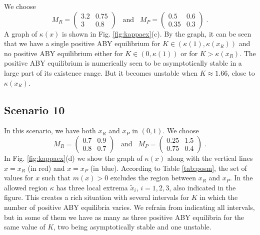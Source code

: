 \documentclass[12pt]{article}
\theoremstyle{definition}
\begin{document}
We choose
\begin{equation}
	M_R= \begin{pmatrix}
		3.2&0.75\\
		3&0.8
	\end{pmatrix} \;\;\;\mathrm{and}\;\;\;M_P= \begin{pmatrix}
		0.5&0.6\\
		0.35&0.3
	\end{pmatrix} \;.
\end{equation}
A graph of $\kappa(x)$ is shown in Fig. \ref{fig:kappaex}(c). By the graph, it can be seen that we have a single positive ABY equilibrium for $K \in (\kappa(1), \kappa(x_R))$ and no positive ABY equilibrium either for $K \in(0,\kappa(1))$ or for $K> \kappa(x_R)$. The positive ABY equilibrium is numerically seen to be asymptotically stable in a large part of its existence range. But it becomes unstable when $K \approx 1.66$, close to $\kappa(x_R)$.  

\subsection{Scenario 10}\label{sub:ex5}
In this scenario, we have both $x_R$ and $x_P$ in $(0,1)$. We choose 
\begin{equation}
	M_R= \begin{pmatrix}
		0.7&0.9\\
		0.8&0.7
	\end{pmatrix} \;\;\;\mathrm{and}\;\;\;M_P= \begin{pmatrix}
		0.25&1.5\\
		0.75&0.4
	\end{pmatrix} \;.
\end{equation}
In Fig. \ref{fig:kappaex}(d) we show the graph of $\kappa(x)$ along with the vertical lines $x=x_R$ (in red) and $x=x_P$ (in blue). According to Table \ref{tab:posm}, the set of values for $x$ such that $m(x)>0$ excludes the region between $x_R$ and $x_P$. In the allowed region $\kappa$ has three local extrema $\tilde{x}_i$, $i=1, 2, 3$, also indicated in the figure. This creates a rich situation with several intervals for $K$ in which the number of positive ABY equilibria varies. We refrain from indicating all intervals, but in some of them we have as many as three positive ABY equilibria for the same value of $K$, two being asymptotically stable and one unstable.
\end{document}
